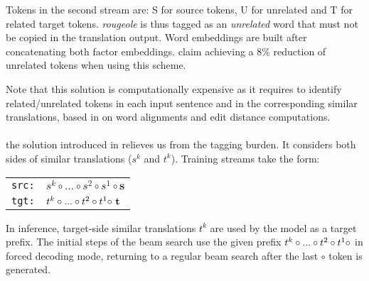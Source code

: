 \begin{center}
\end{center}

Tokens in the second stream are: S for source tokens, U for unrelated and T for related target tokens. {\it rougeole} is thus tagged as an {\it unrelated} word that must not be copied in the translation output.
Word embeddings are built after concatenating both factor embeddings.
%
\citet{xu20boosting} claim achieving a 8\% reduction of unrelated tokens when using this scheme.

Note that this solution is computationally expensive as it requires to identify related/unrelated tokens in each input sentence and in the corresponding similar translations, based in \citet{xu20boosting} on word alignments and edit distance computations.

\paragraph{} the solution introduced in \citet{Pham20Priming} relieves us from the tagging burden. It considers both sides of similar translations ($s^k$ and $t^k$). Training streams take the form:

\begin{center}
\begin{tabular}{rl}
\texttt{src:} & $s^{k} \circ ... \circ s^{2} \circ s^{1} \circ \textbf{s}$ \\
\texttt{tgt:} & $\textcolor{black}{t^{k} \circ ... \circ t^{2} \circ t^{1} \circ}\ \textbf{t}$ \\
\end{tabular}
\end{center}
\noindent In inference, target-side similar translations \textcolor{black}{$t^k$} are used by the model as a target prefix. The initial steps of the beam search use the given prefix $\textcolor{black}{t^{k} \circ ... \circ t^{2} \circ t^{1} \circ}$ in forced decoding mode, returning to a regular beam search after the last \textcolor{black}{$\circ$} token is generated.

